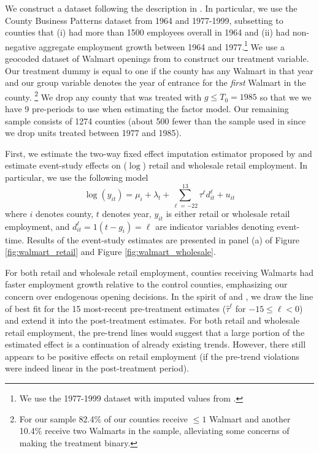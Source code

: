 \documentclass[12pt]{article}
\begin{document}
We construct a dataset following the description in \citet{basker2005job}. In particular, we use the County Business Patterns dataset from 1964 and 1977-1999, subsetting to counties that (i) had more than 1500 employees overall in 1964 and (ii) had non-negative aggregate employment growth between 1964 and 1977.\footnote{We use the 1977-1999 dataset with imputed values from \citet{eckert2021imputing}.} We use a geocoded dataset of Walmart openings from \citet{arcidiacono2020competitive} to construct our treatment variable. Our treatment dummy is equal to one if the county has any Walmart in that year and our group variable denotes the year of entrance for the \emph{first} Walmart in the county. \footnote{For our sample 82.4\% of our counties receive $\leq 1$ Walmart and another 10.4\% receive two Walmarts in the sample, alleviating some concerns of making the treatment binary.} We drop any county that was treated with $g \leq T_0 = 1985$ so that we we have 9 pre-periods to use when estimating the factor model. Our remaining sample consists of 1274 counties (about 500 fewer than the sample used in \citet{basker2005job} since we drop units treated between 1977 and 1985).

First, we estimate the two-way fixed effect imputation estimator proposed by \citet{Borusyak_Jaravel_Spiess_2021} and estimate event-study effects on ($\log$) retail and wholesale retail employment. In particular, we use the following model
\begin{equation}\label{eq:Walmart_twfe}
  \log(y_{it}) = \mu_i + \lambda_t + \sum_{\ell=-22}^{13} \tau^\ell d_{it}^\ell + u_{it}
\end{equation}
where $i$ denotes county, $t$ denotes year, $y_{it}$ is either retail or wholesale retail employment, and $d_{it}^\ell = 1(t - g_i) = \ell$ are indicator variables denoting event-time. Results of the event-study estimates are presented in panel (a) of Figure \ref{fig:walmart_retail} and Figure \ref{fig:walmart_wholesale}.

For both retail and wholesale retail employment, counties receiving Walmarts had faster employment growth relative to the control counties, emphasizing our concern over endogenous opening decisions. In the spirit of \citet{Freyaldenhoven_Hansen_Perez_Shapiro_2022} and \citet{rambachan2022more}, we draw the line of best fit for the 15 most-recent pre-treatment estimates ($\hat{\tau}^\ell$ for $-15 \leq \ell < 0$) and extend it into the post-treatment estimates. For both retail and wholesale retail employment, the pre-trend lines would suggest that a large portion of the estimated effect is a continuation of already existing trends. However, there still appears to be positive effects on retail employment (if the pre-trend violations were indeed linear in the post-treatment period). 
\end{document}
